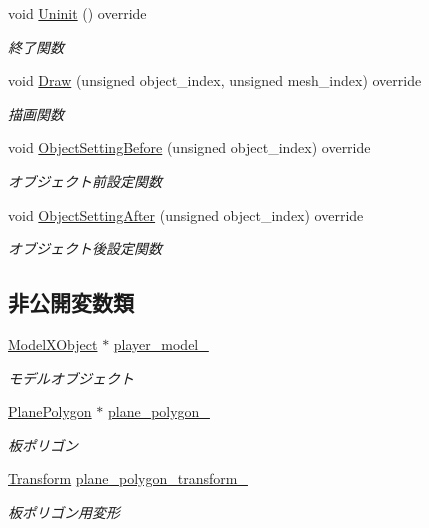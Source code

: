 \begin{DoxyCompactItemize}
void \mbox{\hyperlink{class_stencil_shadow_test_draw_ad0672bf4ecfc8091cf54ed6f2c76b618}{Uninit}} () override
\begin{DoxyCompactList}\small\item\em 終了関数 \end{DoxyCompactList}\item 
void \mbox{\hyperlink{class_stencil_shadow_test_draw_abb5f9445b7d94c213a3751fa57e36643}{Draw}} (unsigned object\+\_\+index, unsigned mesh\+\_\+index) override
\begin{DoxyCompactList}\small\item\em 描画関数 \end{DoxyCompactList}\item 
void \mbox{\hyperlink{class_stencil_shadow_test_draw_ab798b88896ba3f0b3de057dff49823be}{Object\+Setting\+Before}} (unsigned object\+\_\+index) override
\begin{DoxyCompactList}\small\item\em オブジェクト前設定関数 \end{DoxyCompactList}\item 
void \mbox{\hyperlink{class_stencil_shadow_test_draw_a11fa9d700ca8db585b6f0b0be779d1ab}{Object\+Setting\+After}} (unsigned object\+\_\+index) override
\begin{DoxyCompactList}\small\item\em オブジェクト後設定関数 \end{DoxyCompactList}\end{DoxyCompactItemize}
\subsection*{非公開変数類}
\begin{DoxyCompactItemize}
\item 
\mbox{\hyperlink{class_model_x_object}{Model\+X\+Object}} $\ast$ \mbox{\hyperlink{class_stencil_shadow_test_draw_a6c57baf28efdf89dbfb52fb379f33c26}{player\+\_\+model\+\_\+}}
\begin{DoxyCompactList}\small\item\em モデルオブジェクト \end{DoxyCompactList}\item 
\mbox{\hyperlink{class_plane_polygon}{Plane\+Polygon}} $\ast$ \mbox{\hyperlink{class_stencil_shadow_test_draw_ae2abfaec1e669ea0019e67d02e2942b6}{plane\+\_\+polygon\+\_\+}}
\begin{DoxyCompactList}\small\item\em 板ポリゴン \end{DoxyCompactList}\item 
\mbox{\hyperlink{class_transform}{Transform}} \mbox{\hyperlink{class_stencil_shadow_test_draw_ae64a0179736364fd9e6d26074edcf61a}{plane\+\_\+polygon\+\_\+transform\+\_\+}}
\begin{DoxyCompactList}\small\item\em 板ポリゴン用変形 \end{DoxyCompactList}\end{DoxyCompactItemize}
